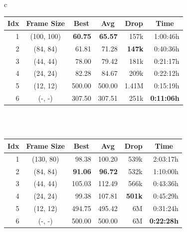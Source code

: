\begin{table}[htp]
    \begin{center}
        \begin{tabular}{c}


            \begin{tabular}{rcrrrr}
                \toprule
                \multicolumn{1}{c}{Idx} & \multicolumn{1}{c}{Frame Size} & \multicolumn{1}{c}{Best} & \multicolumn{1}{c}{Avg} & \multicolumn{1}{c}{Drop} & \multicolumn{1}{c}{Time}\\
                \midrule
                1 & (100, 100) & \textbf{60.75} & \textbf{65.57} & 157k & 1:00:46h \\
                2 & (84, 84) & 61.81 & 71.28 & \textbf{147k} & 0:40:36h \\
                3 & (44, 44) & 78.00 & 79.42 & 181k & 0:21:17h \\
                4 & (24, 24) & 82.28 & 84.67 & 209k & 0:22:12h \\
                5 & (12, 12) & 500.00 & 500.00 & 1.41M & 0:15:19h \\
                6 & (-, -) & 307.50 & 307.51 & 251k & \textbf{0:11:06h} \\
                \bottomrule
            \end{tabular} \\
             \\
            \addlinespace[0.5cm]
            \begin{tabular}{rcrrrr}
                \toprule
                \multicolumn{1}{c}{Idx} & \multicolumn{1}{c}{Frame Size} & \multicolumn{1}{c}{Best} & \multicolumn{1}{c}{Avg} & \multicolumn{1}{c}{Drop} & \multicolumn{1}{c}{Time}\\
                \midrule
                1 & (130, 80) & 98.38 & 100.20 & 539k & 2:03:17h \\
                2 & (84, 84) & \textbf{91.06} & \textbf{96.72} & 532k & 1:10:00h \\
                3 & (44, 44) & 105.03 & 112.49 & 566k & 0:43:36h \\
                4 & (24, 24) & 99.38 & 107.81 & \textbf{501k} & 0:45:29h \\
                5 & (12, 12) & 494.75 & 495.42 & 6M & 0:31:24h \\
                6 & (-, -) & 500.00 & 500.00 & 6M & \textbf{0:22:28h} \\
                \bottomrule

\end{tabular}
\end{tabular}
\end{center}
\end{table}
